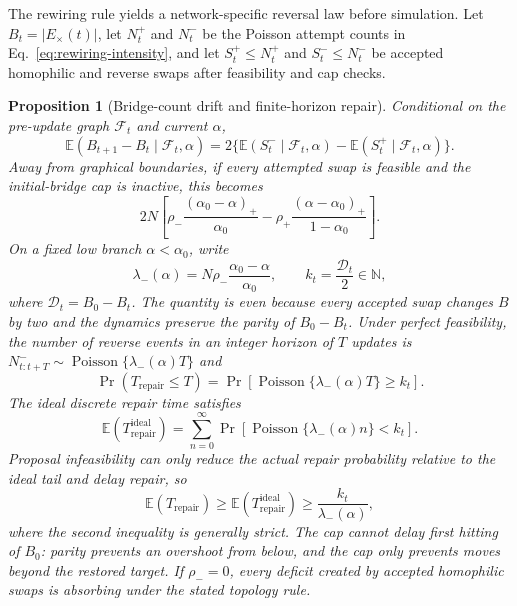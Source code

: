 \documentclass[pdflatex,sn-mathphys-num]{sn-jnl}
\newcommand{\E}{\mathbb{E}}
\newtheorem{proposition}{Proposition}
\begin{document}
The rewiring rule yields a network-specific reversal law before simulation. Let $B_t=|E_\times(t)|$, let $N_t^+$ and $N_t^-$ be the Poisson attempt counts in Eq.~\eqref{eq:rewiring-intensity}, and let $S_t^+\leq N_t^+$ and $S_t^-\leq N_t^-$ be accepted homophilic and reverse swaps after feasibility and cap checks.
\begin{proposition}[Bridge-count drift and finite-horizon repair]
\label{prop:bridge-drift}
Conditional on the pre-update graph $\mathcal F_t$ and current $\alpha$,
\begin{equation}
\E(B_{t+1}-B_t\mid\mathcal F_t,\alpha)
=2\{\E(S_t^-\mid\mathcal F_t,\alpha)-\E(S_t^+\mid\mathcal F_t,\alpha)\}.
\label{eq:bridge-drift}
\end{equation}
Away from graphical boundaries, if every attempted swap is feasible and the initial-bridge cap is inactive, this becomes
\begin{equation}
2N\left[\rho_-\frac{(\alpha_0-\alpha)_+}{\alpha_0}
-\rho_+\frac{(\alpha-\alpha_0)_+}{1-\alpha_0}\right].
\label{eq:interior-bridge-drift}
\end{equation}
On a fixed low branch $\alpha<\alpha_0$, write
\begin{equation}
\lambda_-(\alpha)=N\rho_-\frac{\alpha_0-\alpha}{\alpha_0},
\qquad k_t=\frac{\mathcal D_t}{2}\in\mathbb N,
\end{equation}
where $\mathcal D_t=B_0-B_t$. The quantity is even because every accepted swap changes $B$ by two and the dynamics preserve the parity of $B_0-B_t$. Under perfect feasibility, the number of reverse events in an integer horizon of $T$ updates is $N^-_{t:t+T}\sim\operatorname{Poisson}\{\lambda_-(\alpha)T\}$ and
\begin{equation}
\Pr(T_{\mathrm{repair}}\leq T)
=\Pr[\operatorname{Poisson}\{\lambda_-(\alpha)T\}\geq k_t].
\label{eq:reverse-budget}
\end{equation}
The ideal discrete repair time satisfies
\begin{equation}
\E(T_{\mathrm{repair}}^{\mathrm{ideal}})
=\sum_{n=0}^{\infty}
\Pr[\operatorname{Poisson}\{\lambda_-(\alpha)n\}<k_t].
\label{eq:ideal-mean-repair-time}
\end{equation}
Proposal infeasibility can only reduce the actual repair probability relative to the ideal tail and delay repair, so
\begin{equation}
\E(T_{\mathrm{repair}})
\geq \E(T_{\mathrm{repair}}^{\mathrm{ideal}})
\geq \frac{k_t}{\lambda_-(\alpha)},
\label{eq:mean-repair-time}
\end{equation}
where the second inequality is generally strict. The cap cannot delay first hitting of $B_0$: parity prevents an overshoot from below, and the cap only prevents moves beyond the restored target. If $\rho_-=0$, every deficit created by accepted homophilic swaps is absorbing under the stated topology rule.
\end{proposition}
\end{document}
